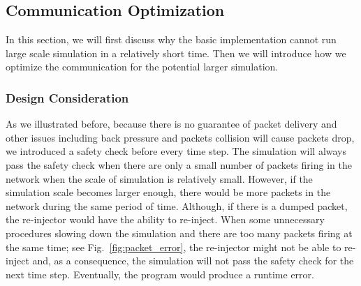 \subsection{Communication Optimization} \label{sec:co}
In this section, we will first discuss why the basic implementation cannot run large scale simulation in a relatively short time. Then we will introduce how we optimize the communication for the potential larger simulation.\\
\subsubsection{Design Consideration}
As we illustrated before, because there is no guarantee of packet delivery and other issues including back pressure and packets collision will cause packets drop, we introduced a safety check before every time step. The simulation will always pass the safety check when there are only a small number of packets firing in the network when the scale of simulation is relatively small. However, if the simulation scale becomes larger enough, there would be more packets in the network during the same period of time. Although, if there is a dumped packet, the re-injector would have the ability to re-inject. When some unnecessary procedures slowing down the simulation and there are too many packets firing at the same time; see Fig.~\ref{fig:packet_error}, the re-injector might not be able to re-inject and, as a consequence, the simulation will not pass the safety check for the next time step. Eventually, the program would produce a runtime error.\\

